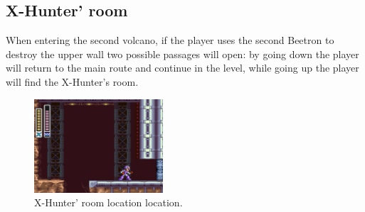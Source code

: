 \subsection{X-Hunter' room}
When entering the second volcano, if the player uses the second Beetron to destroy the upper wall two possible passages will open: by going down the player will return to the main route and continue in the level, while going up the player will find the X-Hunter's room.
\begin{figure}[htp]
	\centering
	\includegraphics[height=3.5cm]{figures/X2/Flame_stag/Stag_Hunter_room.png}
	\caption{X-Hunter' room location location.}
\end{figure}


